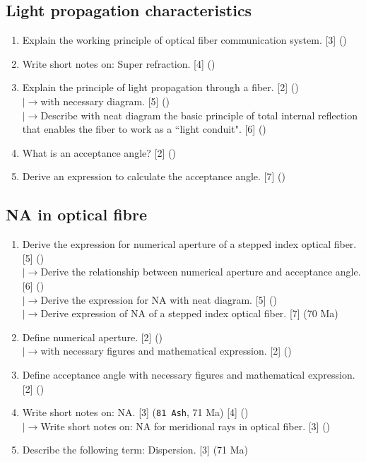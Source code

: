\documentclass[12pt]{article}
\newcommand{\lb}{\\$\left|\rightarrow\right.$}
\begin{document}
  \subsection{Light propagation characteristics}
    \begin{enumerate}
      \item Explain the working principle of optical fiber communication system. \hfill [3] ()

      \item Write short notes on: Super refraction. \hfill [4] ()

      \item Explain the principle of light propagation through a fiber. \hfill [2] ()
        \lb with necessary diagram. \hfill [5] ()
        \lb Describe with neat diagram the basic principle of total internal reflection that enables the fiber to work as a ``light conduit". \hfill [6] ()

      \item What is an acceptance angle? \hfill [2] ()

      \item Derive an expression to calculate the acceptance angle. \hfill [7] ()
    \end{enumerate}

  \subsection{NA in optical fibre}
    \begin{enumerate}
      \item Derive the expression for numerical aperture of a stepped index optical fiber. \hfill [5] ()
        \lb Derive the relationship between numerical aperture and acceptance angle. \hfill [6] ()
        \lb Derive the expression for NA with neat diagram. \hfill [5] ()
        \lb Derive expression of NA of a stepped index optical fiber. \hfill [7] (70 Ma)

      \item Define numerical aperture. \hfill [2] ()
        \lb with necessary figures and mathematical expression. \hfill [2] ()
      
      \item Define acceptance angle with necessary figures and mathematical expression. \hfill [2] ()

      \item Write short notes on: NA. \hfill [3] (\texttt{81 Ash}, 71 Ma) [4] ()
        \lb Write short notes on: NA for meridional rays in optical fiber. \hfill [3] ()

      \item Describe the following term: Dispersion. \hfill [3] (71 Ma)
    \end{enumerate}
\end{document}
